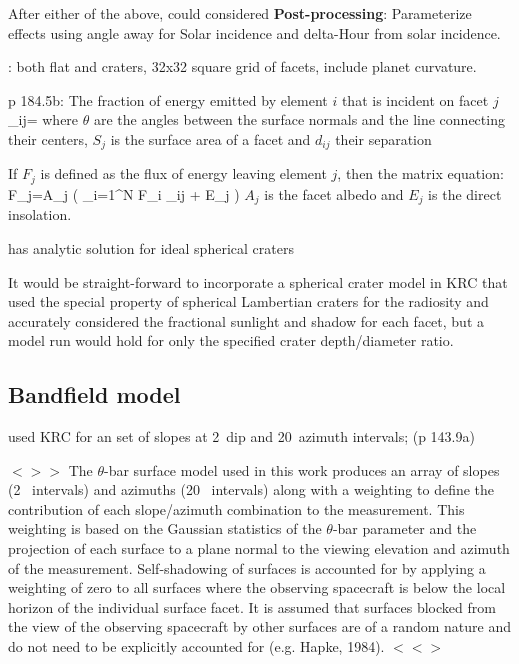 \documentclass{article}
\newcommand{\bq}{$ < \! > \!   \! >$ } %
\newcommand{\eq}{ $< \! \! < \! > $ } %
\begin{document}
After either of the above, could considered \textbf{Post-processing}:
Parameterize effects using angle away for Solar incidence and delta-Hour from
solar incidence.

: both flat and craters, 32x32 square grid of facets,
 include planet curvature. 

p 184.5b: The fraction of energy emitted by element $i$ that is incident on
facet $j$ 
\qbn \alpha_{ij}= \qen 
where $\theta$ are the angles between the surface normals and the line
connecting their centers, $S_j$ is the surface area of a facet and $d_{ij}$
their separation

If $F_j$ is defined as the flux of energy leaving element $j$, then the matrix equation:
\qb F_j=A_j \left( \sum_{i=1}^N F_i \alpha_{ij} + E_j \right) \qe
$A_j$ is the facet albedo and $E_j$ is the direct insolation.

 has analytic solution for ideal spherical craters

It would be straight-forward to incorporate a spherical crater model in KRC that
used the special property of spherical Lambertian craters for the radiosity and
accurately considered the fractional sunlight and shadow for each facet, but a
model run would hold for only the specified crater depth/diameter ratio.

\subsection{Bandfield model}

 used KRC for an set of slopes at 2\qd ~dip and 20\qd ~azimuth intervals; (p 143.9a)

\bq The $\theta$-bar surface model used in this work produces an array of slopes
(2\qd~ intervals) and azimuths (20\qd~ intervals) along with a weighting to
define the contribution of each slope/azimuth combination to the
measurement. This weighting is based on the Gaussian statistics of the
$\theta$-bar parameter and the projection of each surface to a plane normal to
the viewing elevation and azimuth of the measurement. Self-shadowing of surfaces
is accounted for by applying a weighting of zero to all surfaces where the
observing spacecraft is below the local horizon of the individual surface
facet. It is assumed that surfaces blocked from the view of the observing
spacecraft by other surfaces are of a random nature and do not need to be
explicitly accounted for (e.g. Hapke, 1984). \eq
\end{document}
